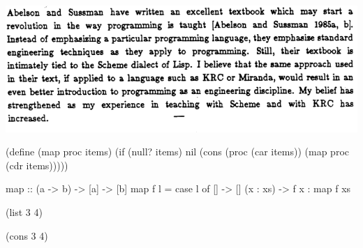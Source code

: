 \documentclass[UKenglish,usenames,dvipsnames,svgnames,table,aspectratio=169,mathserif]{beamer}
\newcommand{\nl}{\vspace{\baselineskip}}
\begin{document}
\begin{frame}
\centering
\includegraphics[scale=0.55]{wadler-abstract.png}
\end{frame}


\begin{frame}[fragile]
\begin{schemecode}
(define (map proc items)
  (if (null? items)
      nil
      (cons (proc (car items))
            (map proc (cdr items)))))
\end{schemecode}
\nl

\begin{haskellcode}
map :: (a -> b) -> [a] -> [b]
map f l =
  case l of
    []       -> []
    (x : xs) -> f x : map f xs
\end{haskellcode}
\end{frame}


\begin{frame}[fragile]
\LARGE
\begin{schemecode}
             (list 3 4)

             (cons 3 4)
\end{schemecode}
\end{frame}
\end{document}
